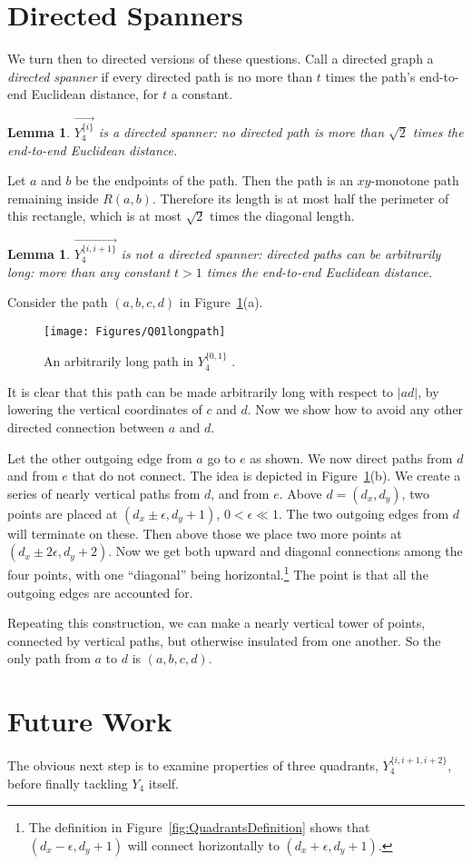 \pdfoutput=1  \documentclass[]{article}
\newcommand{\ABox}{
\raisebox{3pt}{\framebox[6pt]{\rule{6pt}{0pt}}}
}
\newenvironment{proof}{{\bf Proof:}}{\hfill\ABox}
\newtheorem{lemma}[theorem]{Lemma}
\newcommand{\figlab}[1]{\label{fig:#1}}
\newcommand{\figref}[1]{\ref{fig:#1}}
\begin{document}
\section{Directed Spanners}
We turn then to directed versions of these questions.
Call a directed graph a \emph{directed spanner} if every directed path
is no more than $t$ times the path's end-to-end Euclidean distance,
for $t$ a constant.


\begin{lemma}
$\overrightarrow{Y_4^{\{i\}}}$ is a directed spanner:
no directed path is more than $\sqrt{2}$ times the end-to-end Euclidean distance.
\end{lemma}
\begin{proof}
Let $a$ and $b$ be the endpoints of the path.
Then the path is an $xy$-monotone path remaining inside
$R(a,b)$.  Therefore its length is at most half the perimeter of this
rectangle, which is at most $\sqrt{2}$ times the diagonal length.
\end{proof}

\begin{lemma}
$\overrightarrow{Y_4^{\{i,i+1\}}}$ is not a directed spanner:
directed paths can be arbitrarily long:
more than any constant $t>1$ times the end-to-end Euclidean distance.
\end{lemma}
\begin{proof}
Consider the path $(a,b,c,d)$ in Figure~\figref{Q01longpath}(a).
\begin{figure}[htbp]
\centering
\texttt{[image: Figures/Q01longpath]}
\caption{An arbitrarily long path in $Y_4^{\{0,1\}}$ .}
\figlab{Q01longpath}
\end{figure}
It is clear that this path can be made arbitrarily long with respect to $|ad|$,
by lowering the vertical coordinates of $c$ and $d$.
Now we show how to avoid any other directed connection between $a$ and $d$.

Let the other outgoing edge from $a$ go to $e$ as shown.
We now direct paths from $d$ and from $e$ that do not connect.
The idea is depicted in Figure~\figref{Q01longpath}(b).
We create a series of nearly vertical paths from $d$, and from $e$.
Above $d=(d_x,d_y)$, two points are placed at $(d_x \pm \epsilon, d_y+1)$,
$0 < \epsilon \ll 1$.
The two outgoing edges from $d$ will terminate on these.
Then above those we place two more points at $(d_x \pm 2 \epsilon, d_y+2)$.
Now we get both upward and diagonal connections among the four points,
with one ``diagonal'' being horizontal.\footnote{
	The definition in Figure~\protect\figref{QuadrantsDefinition} shows that
	 $(d_x - \epsilon, d_y+1)$ will connect horizontally to $(d_x + \epsilon, d_y+1)$.
	 }
The point is that all the outgoing edges are
accounted for.

Repeating this construction, we can make a nearly vertical tower of points,
connected by vertical paths, but otherwise insulated from one another.
So the only path from $a$ to $d$ is $(a,b,c,d)$.
\end{proof}

\section{Future Work}
The obvious next step is to examine properties of three
quadrants, $Y_4^{\{i,i+1,i+2\}}$, before finally tackling $Y_4$ itself.






\end{document}
